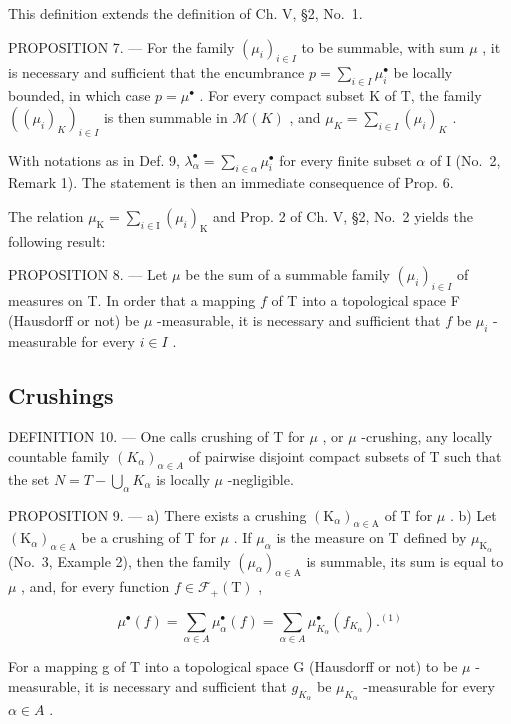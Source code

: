 This definition extends the definition of Ch. V, §2, No.~1.

PROPOSITION 7. --- For the family \((\mu_i)_{i \in I}\) to be summable, with sum \(\mu\) , it is necessary and sufficient that the encumbrance \(p = \sum_{i \in I} \mu_i^\bullet\) be locally bounded, in which case \(p = \mu^\bullet\) . For every compact subset K of T, the family \(\left((\mu_i)_K\right)_{i \in I}\) is then summable in \(\mathcal{M}(K)\) , and \(\mu_K = \sum_{i \in I} (\mu_i)_K\) .

With notations as in Def. 9, \(\lambda_{\alpha}^{\bullet} = \sum_{i\in \alpha}\mu_{i}^{\bullet}\) for every finite subset \(\alpha\) of I (No.~2, Remark 1). The statement is then an immediate consequence of Prop. 6.

The relation \(\mu_{\mathrm{K}} = \sum_{i\in \mathrm{I}}(\mu_i)_{\mathrm{K}}\) and Prop. 2 of Ch. V, §2, No.~2 yields the following result:

PROPOSITION 8. --- Let \(\mu\) be the sum of a summable family \((\mu_i)_{i \in I}\) of measures on T. In order that a mapping \(f\) of T into a topological space F (Hausdorff or not) be \(\mu\) -measurable, it is necessary and sufficient that \(f\) be \(\mu_i\) -measurable for every \(i \in I\) .

\subsection{Crushings}

DEFINITION 10. --- One calls crushing of T for \(\mu\) , or \(\mu\) -crushing, any locally countable family \((K_{\alpha})_{\alpha \in A}\) of pairwise disjoint compact subsets of T such that the set \(N = T - \bigcup_{\alpha} K_{\alpha}\) is locally \(\mu\) -negligible.

PROPOSITION 9. --- a) There exists a crushing \((\mathrm{K}_{\alpha})_{\alpha \in \mathrm{A}}\) of T for \(\mu\) . b) Let \((\mathrm{K}_{\alpha})_{\alpha \in \mathrm{A}}\) be a crushing of T for \(\mu\) . If \(\mu_{\alpha}\) is the measure on T defined by \(\mu_{\mathrm{K}_{\alpha}}\) (No.~3, Example 2), then the family \((\mu_{\alpha})_{\alpha \in \mathrm{A}}\) is summable, its sum is equal to \(\mu\) , and, for every function \(f \in \mathcal{F}_{+}(\mathrm{T})\) ,

\[
\mu^ {\bullet} (f) = \sum_ {\alpha \in A} \mu_ {\alpha} ^ {\bullet} (f) = \sum_ {\alpha \in A} \mu_ {K _ {\alpha}} ^ {\bullet} (f _ {K _ {\alpha}}). ^ {(1)}\tag{7}
\]

For a mapping g of T into a topological space G (Hausdorff or not) to be \(\mu\) -measurable, it is necessary and sufficient that \(g_{K_{\alpha}}\) be \(\mu_{K_{\alpha}}\) -measurable for every \(\alpha \in A\) .


